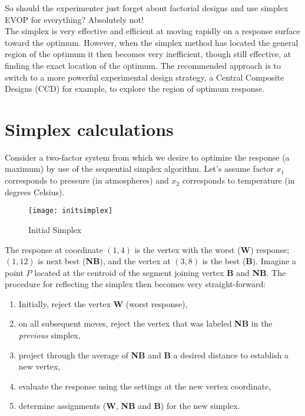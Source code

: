 So should the experimenter just forget about factorial designs and use simplex EVOP for everything?  Absolutely not!\\


The simplex is very effective and efficient at moving rapidly on a response surface toward the optimum.  However, when the simplex method has located the general region of the optimum it then becomes very inefficient, though still effective, at finding the exact location of the optimum. The recommended approach is to switch to a more powerful experimental design strategy, a Central Composite Designs (CCD) for example, to explore the region of optimum response.

\section{Simplex calculations}\label{simplex-calc}
Consider a two-factor system from which we desire to optimize the response (a maximum) by use of the sequential simplex algorithm.  Let's assume factor $x_{1}$ corresponds to pressure (in atmospheres)  and $x_{2}$ corresponds to temperature (in degrees Celsius).

\begin{figure}[h]\caption{Initial Simplex}\label{initsimplex}
\begin{center}
\texttt{[image: initsimplex]}
\end{center}
\end{figure}

The response at coordinate $(1,4)$ is the vertex with the worst (\textbf{W}) response; $(1,12)$ is next best (\textbf{NB}), and the vertex at $(3,8)$ is the best (\textbf{B}). Imagine a point $P$ located at the centroid of the segment joining vertex \textbf{B} and \textbf{NB}. The procedure for reflecting the simplex then becomes very straight-forward:

\begin{enumerate}
\item Initially, reject the vertex \textbf{W} (worst response),
\item on all subsequent moves, reject the vertex that was labeled \textbf{NB} in the \textit{previous} simplex,
\item project through the average of \textbf{NB} and \textbf{B} a desired distance to establish a new vertex,
\item evaluate the response using the settings at the new vertex coordinate,
\item determine assignments (\textbf{W}, \textbf{NB} and \textbf{B}) for the new simplex.
\end{enumerate}

